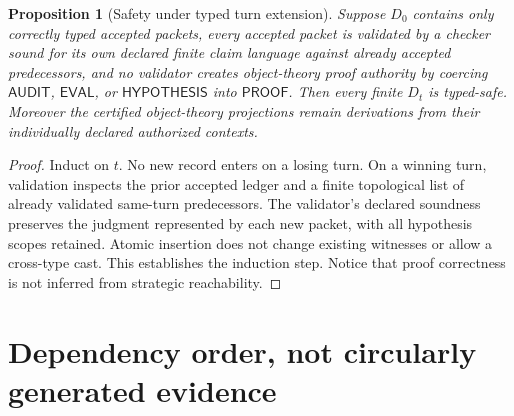 \documentclass[11pt,letterpaper]{article}
\newtheorem{proposition}[theorem]{Proposition}
\newcommand{\Pk}{\mathsf{PROOF}}
\newcommand{\Au}{\mathsf{AUDIT}}
\newcommand{\Ev}{\mathsf{EVAL}}
\newcommand{\Hy}{\mathsf{HYPOTHESIS}}
\begin{document}
\begin{proposition}[Safety under typed turn extension]\label{prop:safety}
Suppose $D_0$ contains only correctly typed accepted packets, every accepted packet is validated by a checker sound \emph{for its own declared finite claim language} against already accepted predecessors, and no validator creates object-theory proof authority by coercing $\Au$, $\Ev$, or $\Hy$ into $\Pk$. Then every finite $D_t$ is typed-safe. Moreover the certified object-theory projections remain derivations from their individually declared authorized contexts.
\end{proposition}
\begin{proof}
Induct on $t$. No new record enters on a losing turn. On a winning turn, validation inspects the prior accepted ledger and a finite topological list of already validated same-turn predecessors. The validator's declared soundness preserves the judgment represented by each new packet, with all hypothesis scopes retained. Atomic insertion does not change existing witnesses or allow a cross-type cast. This establishes the induction step. Notice that proof correctness is not inferred from strategic reachability.
\end{proof}

\section{Dependency order, not circularly generated evidence}\label{gl-first-W1-s3}
\end{document}
